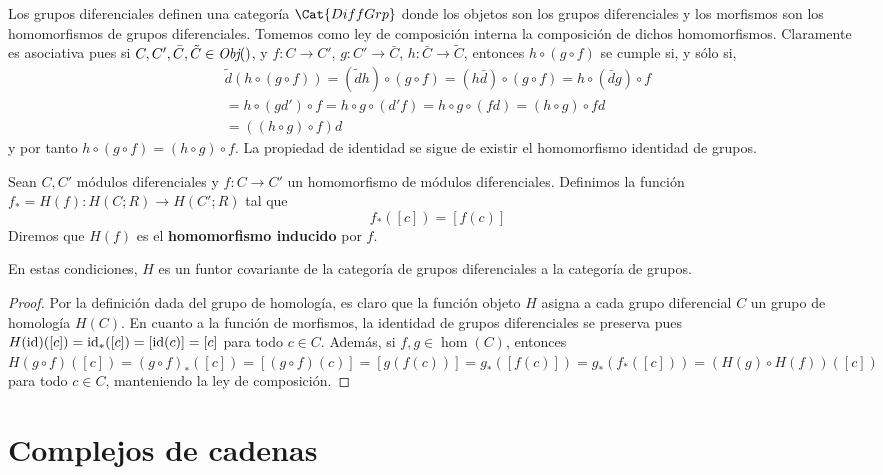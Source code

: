Los grupos diferenciales definen una categoría $\Cat{DiffGrp}$ donde los objetos son los grupos diferenciales y los morfismos son los homomorfismos de grupos diferenciales. Tomemos como ley de composición interna la composición de dichos homomorfismos. Claramente es asociativa pues si \(C, C', \bar{C}, \tilde{C} \in \operatorname{\textit{Obj}}()\), y \(f\colon C \to C'\), \(g \colon C' \to \bar{C}\), \(h\colon \bar{C} \to \tilde{C}\), entonces \(h \circ (g \circ f)\) se cumple si, y sólo si,
\begin{gather*}
	\tilde{d}(h \circ (g \circ f)) = (\tilde{d}h) \circ (g \circ f) = (h\bar{d}) \circ (g \circ f) = h \circ (\bar{d}g) \circ f \\
	= h \circ (g d') \circ f = h \circ g \circ (d'f) = h \circ g \circ (fd) = (h \circ g) \circ fd \\
	= ((h \circ g) \circ f) d
\end{gather*}
y por tanto \(h \circ (g \circ f) = (h \circ g) \circ f\). La propiedad de identidad se sigue de existir el homomorfismo identidad de grupos.

\begin{definicion}
	Sean \(C, C'\) módulos diferenciales y \(f:C \rightarrow C'\) un homomorfismo de módulos
	diferenciales. Definimos la función \(f_{*} = H(f): H(C;R) \rightarrow H(C';R)\)
	tal que
	\[
	f_{*}([c]) = [f(c)]
	\]
	Diremos que \(H(f)\) es el \textbf{homomorfismo inducido} por \(f\).
\end{definicion}
\begin{proposicion}
	En estas condiciones, \(H\) es un funtor covariante de la categoría de grupos diferenciales a la categoría de grupos.
\end{proposicion}
\begin{proof}
	Por la definición dada del grupo de homología, es claro que la función objeto \(H\) asigna a cada grupo diferencial \(C\) un grupo de homología \(H(C)\). En cuanto a la función de morfismos, la identidad de grupos diferenciales se preserva pues \(H(\operatorname{id})([c]) = \operatorname{id}_*([c]) = [\operatorname{id}(c)] = [c]\) para todo \(c \in C\). Además, si \(f,g \in \hom(C)\), entonces \(H(g \circ f)([c]) = (g \circ f)_*([c]) = [(g \circ f)(c)] = [g (f (c))] = g_*([f(c)]) = g_* ( f_*([c])) = (H(g) \circ H(f)) ([c])\) para todo \(c \in C\), manteniendo la ley de composición.
\end{proof}

\section{Complejos de cadenas}

